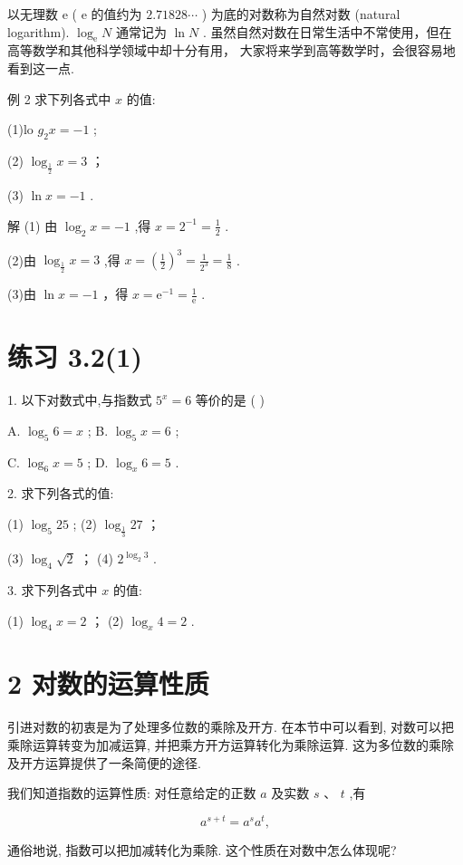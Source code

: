 \documentclass[10pt]{article}
\begin{document}
以无理数 \(\mathrm{e}\) ( \(\mathrm{e}\) 的值约为 \({2.71828}\cdots\) ) 为底的对数称为自然对数 (natural logarithm). \({\log }_{\mathrm{e}}N\) 通常记为 \(\ln N\) . 虽然自然对数在日常生活中不常使用，但在高等数学和其他科学领域中却十分有用， 大家将来学到高等数学时，会很容易地看到这一点.

例 2 求下列各式中 \(x\) 的值:

(1)lo \({g}_{2}x =  - 1\) ;

(2) \({\log }_{\frac{1}{2}}x = 3\) ；

(3) \(\ln x =  - 1\) .

解 (1) 由 \({\log }_{2}x =  - 1\) ,得 \(x = {2}^{-1} = \frac{1}{2}\) .

(2)由 \({\log }_{\frac{1}{2}}x = 3\) ,得 \(x = {\left( \frac{1}{2}\right) }^{3} = \frac{1}{{2}^{3}} = \frac{1}{8}\) .

(3)由 \(\ln x =  - 1\) ，得 \(x = {\mathrm{e}}^{-1} = \frac{1}{\mathrm{e}}\) .

\section*{练习 3.2(1)}

1. 以下对数式中,与指数式 \({5}^{x} = 6\) 等价的是 ( )

A. \({\log }_{5}6 = x\) ; B. \({\log }_{5}x = 6\) ;

C. \({\log }_{6}x = 5\) ; D. \({\log }_{x}6 = 5\) .

2. 求下列各式的值:

(1) \({\log }_{5}{25}\) ; (2) \({\log }_{\frac{1}{3}}{27}\) ；

(3) \({\log }_{4}\sqrt{2}\) ； (4) \({2}^{{\log }_{2}3}\) .

3. 求下列各式中 \(x\) 的值:

(1) \({\log }_{4}x = 2\) ； (2) \({\log }_{x}4 = 2\) .

\section*{2 对数的运算性质}

引进对数的初衷是为了处理多位数的乘除及开方. 在本节中可以看到, 对数可以把乘除运算转变为加减运算, 并把乘方开方运算转化为乘除运算. 这为多位数的乘除及开方运算提供了一条简便的途径.

我们知道指数的运算性质: 对任意给定的正数 \(a\) 及实数 \(s\) 、 \(t\) ,有

\[
{a}^{s + t} = {a}^{s}{a}^{t},
\]

通俗地说, 指数可以把加减转化为乘除. 这个性质在对数中怎么体现呢?
\end{document}
